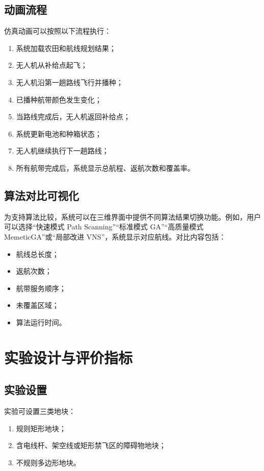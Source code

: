 \documentclass[UTF8,a4paper,12pt]{ctexart}
\begin{document}
\subsection{动画流程}

仿真动画可以按照以下流程执行：

\begin{enumerate}
    \item 系统加载农田和航线规划结果；
    \item 无人机从补给点起飞；
    \item 无人机沿第一趟路线飞行并播种；
    \item 已播种航带颜色发生变化；
    \item 当路线完成后，无人机返回补给点；
    \item 系统更新电池和种箱状态；
    \item 无人机继续执行下一趟路线；
    \item 所有航带完成后，系统显示总航程、返航次数和覆盖率。
\end{enumerate}

\subsection{算法对比可视化}

为支持算法比较，系统可以在三维界面中提供不同算法结果切换功能。例如，用户可以选择“快速模式 Path Scanning”“标准模式 GA”“高质量模式 MemeticGA”或“局部改进 VNS”，系统显示对应航线。对比内容包括：

\begin{itemize}
    \item 航线总长度；
    \item 返航次数；
    \item 航带服务顺序；
    \item 未覆盖区域；
    \item 算法运行时间。
\end{itemize}

\section{实验设计与评价指标}

\subsection{实验设置}

实验可设置三类地块：

\begin{enumerate}
    \item 规则矩形地块；
    \item 含电线杆、架空线或矩形禁飞区的障碍物地块；
    \item 不规则多边形地块。
\end{enumerate}
\end{document}
